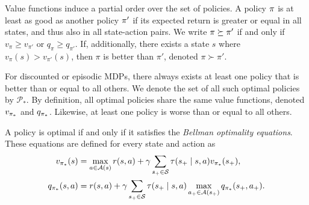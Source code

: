 \vspace{-0.1cm}


Value functions induce a partial order over the set of policies. 
A policy $\pi$ is at least as good as another policy $\pi'$ if its expected return is greater or equal in all states, and thus also in all state-action pairs.
We write $\pi \succeq \pi'$ if and only if $v_{\pi} \ge v_{\pi'}$ or $q_{\pi} \ge q_{\pi'}$.
If, additionally, there exists a state $s$ where $v_{\pi}(s) > v_{\pi'}(s)$, then $\pi$ is better than $\pi'$, denoted $\pi \succ \pi'$.

\vspace{-0.1cm}

For discounted or episodic MDPs, there always exists at least one policy that is better than or equal to all others.
We denote the set of all such optimal policies by $\mathcal P_*$.
By definition, all optimal policies share the same value functions, denoted $v_{{\pi}_*}$ and $q_{{\pi}_*}$.
% 
Likewise, at least one policy is worse than or equal to all others.

\vspace{-0.1cm}

A policy is optimal if and only if it satisfies the \textit{Bellman optimality equations}. These equations are defined for every state and action as
\begin{align*}
    v_{{\pi}_*}(s)
    &= \max_{a \in \mathcal{A}(s)} r(s, a) + \gamma \sum_{s_+ \in \mathcal{S}} \tau(s_+ \mid s, a) v_{{\pi}_*}(s_+) ,
    \\
    q_{{\pi}_*}(s,a)
    &= r(s, a) + \gamma \sum_{s_+ \in \mathcal{S}} \tau(s_+ \mid s, a) \max_{a_+ \in \mathcal{A}(s_+)} q_{{\pi}_*}(s_+, a_+) .
\end{align*}
% 

